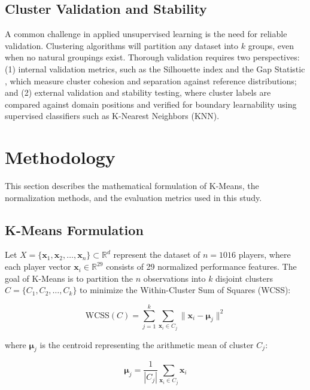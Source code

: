 \documentclass[12pt]{ai_conquer2026}
\begin{document}
\subsection{Cluster Validation and Stability}
A common challenge in applied unsupervised learning is the need for reliable validation. Clustering algorithms will partition any dataset into $k$ groups, even when no natural groupings exist. Thorough validation requires two perspectives: (1) internal validation metrics, such as the Silhouette index \cite{rousseeuw1987silhouettes} and the Gap Statistic \cite{tibshirani2001estimating}, which measure cluster cohesion and separation against reference distributions; and (2) external validation and stability testing, where cluster labels are compared against domain positions and verified for boundary learnability using supervised classifiers such as K-Nearest Neighbors (KNN).

\section{Methodology}
\label{sec:methodology}

This section describes the mathematical formulation of K-Means, the normalization methods, and the evaluation metrics used in this study.

\subsection{K-Means Formulation}
Let $X = \{\mathbf{x}_1, \mathbf{x}_2, \ldots, \mathbf{x}_n\} \subset \mathbb{R}^d$ represent the dataset of $n = 1016$ players, where each player vector $\mathbf{x}_i \in \mathbb{R}^{29}$ consists of 29 normalized performance features. The goal of K-Means is to partition the $n$ observations into $k$ disjoint clusters $C = \{C_1, C_2, \ldots, C_k\}$ to minimize the Within-Cluster Sum of Squares (WCSS):

\begin{equation}
\text{WCSS}(C) = \sum_{j=1}^{k} \sum_{\mathbf{x}_i \in C_j} \|\mathbf{x}_i - \boldsymbol{\mu}_j\|^2
\end{equation}

where $\boldsymbol{\mu}_j$ is the centroid representing the arithmetic mean of cluster $C_j$:

\begin{equation}
\boldsymbol{\mu}_j = \frac{1}{|C_j|} \sum_{\mathbf{x}_i \in C_j} \mathbf{x}_i
\end{equation}
\end{document}
